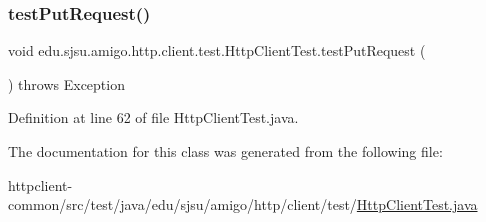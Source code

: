 \subsubsection{\texorpdfstring{test\+Put\+Request()}{testPutRequest()}}
{\footnotesize\ttfamily void edu.\+sjsu.\+amigo.\+http.\+client.\+test.\+Http\+Client\+Test.\+test\+Put\+Request (\begin{DoxyParamCaption}{ }\end{DoxyParamCaption}) throws Exception}



Definition at line 62 of file Http\+Client\+Test.\+java.



The documentation for this class was generated from the following file\+:\begin{DoxyCompactItemize}
\item 
httpclient-\/common/src/test/java/edu/sjsu/amigo/http/client/test/\hyperlink{_http_client_test_8java}{Http\+Client\+Test.\+java}\end{DoxyCompactItemize}
